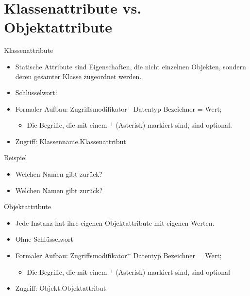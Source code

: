 \documentclass{../tuda-beamer}
\begin{document}
    \section{Klassenattribute vs. Objektattribute}
    \begin{frame}{Klassenattribute}
        \begin{itemize}
            \item Statische Attribute sind Eigenschaften, die nicht einzelnen Objekten, sondern
            deren gesamter Klasse zugeordnet werden.
            \item Schlüsselwort: 
            \item Formaler Aufbau: Zugriffsmodifikator\(^+\)  Datentyp
            Bezeichner = Wert;
            \begin{itemize}
                \item Die Begriffe, die mit einem \(^+\) (Asterisk) markiert sind, sind optional.
            \end{itemize}
            \item Zugriff: Klassenname.Klassenattribut
        \end{itemize}
    \end{frame}

    \begin{frame}[c]{Beispiel}
        
    \end{frame}

    \begin{frame}[c]
        \begin{itemize}
            \item Welchen Namen gibt  zurück?
            \item Welchen Namen gibt  zurück?
        \end{itemize}

        
    \end{frame}

    \begin{frame}{Objektattribute}
        \begin{itemize}
            \item Jede Instanz hat ihre eigenen Objektattribute mit eigenen Werten.
            \item Ohne Schlüsselwort 
            \item Formaler Aufbau: Zugriffsmodifikator\(^+\) Datentyp Bezeichner =
            Wert;
            \begin{itemize}
                \item Die Begriffe, die mit einem \(^+\) (Asterisk) markiert sind, sind optional
            \end{itemize}
            \item Zugriff: Objekt.Objektattribut
        \end{itemize}
    \end{frame}
\end{document}
